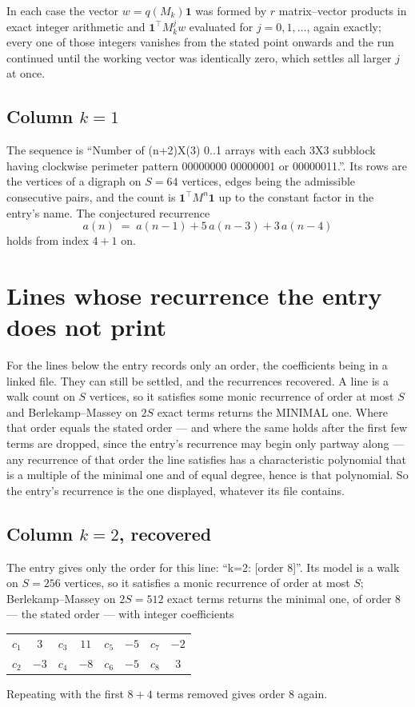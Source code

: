 \documentclass[11pt,a4paper]{article}
\theoremstyle{plain}
\theoremstyle{definition}
\begin{document}
In each case the vector $w=q(M_k)\mathbf{1}$ was formed by $r$ matrix--vector products in
exact integer arithmetic and $\mathbf{1}^{\!\top}M_k^{j}w$ evaluated for $j=0,1,\dots$,
again exactly; every one of those integers vanishes from the stated point onwards and the run
continued until the working vector was identically zero, which settles all larger $j$ at once.

\subsection*{Column $k$$=1$}
The sequence is ``Number of (n+2)X(3) 0..1 arrays with each 3X3 subblock having clockwise perimeter pattern 00000000 00000001 or 00000011.''. Its rows are the vertices of a digraph on
$S=64$ vertices, edges being the admissible consecutive pairs, and the count is
$\mathbf{1}^{\!\top}M^{n}\mathbf{1}$ up to the constant factor in the entry's name.
The conjectured recurrence
\[
a(n)\;=\;a(n-1) + 5\,a(n-3) + 3\,a(n-4)
\]
holds from index $4+1$ on.


\section{Lines whose recurrence the entry does not print}

For the lines below the entry records only an order, the coefficients being in a linked file.
They can still be settled, and the recurrences recovered. A line is a walk count on $S$
vertices, so it satisfies some monic recurrence of order at most $S$ and Berlekamp--Massey on
$2S$ exact terms returns the MINIMAL one. Where that order equals the stated order --- and
where the same holds after the first few terms are dropped, since the entry's recurrence may
begin only partway along --- any recurrence of that order the line satisfies has a
characteristic polynomial that is a multiple of the minimal one and of equal degree, hence is
that polynomial. So the entry's recurrence is the one displayed, whatever its file contains.

\subsection*{Column $k=2$, recovered}
The entry gives only the order for this line: ``k=2: [order 8]''. Its model is a walk on
$S=256$ vertices, so it satisfies a monic recurrence of order at most $S$;
Berlekamp--Massey on $2S=512$ exact terms returns the minimal one, of order
$8$ --- the stated order --- with integer coefficients
\begin{center}\small\begin{tabular}{cccccccc}
$c_{1}$ & $3$ & $c_{3}$ & $11$ & $c_{5}$ & $-5$ & $c_{7}$ & $-2$ \\
$c_{2}$ & $-3$ & $c_{4}$ & $-8$ & $c_{6}$ & $-5$ & $c_{8}$ & $3$ \\
\end{tabular}\end{center}
Repeating with the first $8+4$ terms removed gives order $8$ again.
\end{document}
